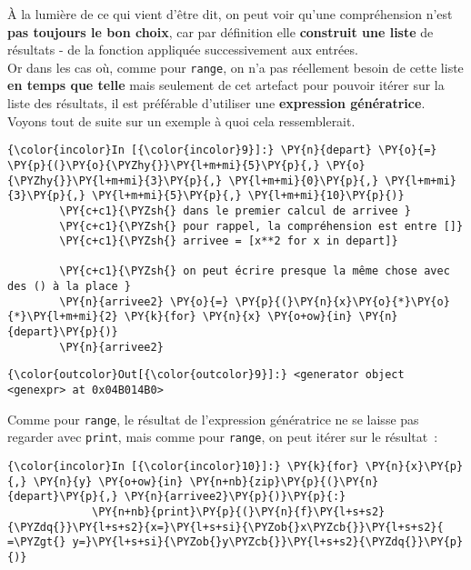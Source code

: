     À la lumière de ce qui vient d'être dit, on peut voir qu'une
compréhension n'est \textbf{pas toujours le bon choix}, car par
définition elle \textbf{construit une liste} de résultats - de la
fonction appliquée successivement aux entrées.\\

Or dans les cas où, comme pour \texttt{range}, on n'a pas réellement
besoin de cette liste \textbf{en temps que telle} mais seulement de cet
artefact pour pouvoir itérer sur la liste des résultats, il est
préférable d'utiliser une \textbf{expression génératrice}.\\

Voyons tout de suite sur un exemple à quoi cela ressemblerait.

    \begin{Verbatim}[commandchars=\\\{\}]
{\color{incolor}In [{\color{incolor}9}]:} \PY{n}{depart} \PY{o}{=} \PY{p}{(}\PY{o}{\PYZhy{}}\PY{l+m+mi}{5}\PY{p}{,} \PY{o}{\PYZhy{}}\PY{l+m+mi}{3}\PY{p}{,} \PY{l+m+mi}{0}\PY{p}{,} \PY{l+m+mi}{3}\PY{p}{,} \PY{l+m+mi}{5}\PY{p}{,} \PY{l+m+mi}{10}\PY{p}{)}
        \PY{c+c1}{\PYZsh{} dans le premier calcul de arrivee }
        \PY{c+c1}{\PYZsh{} pour rappel, la compréhension est entre []}
        \PY{c+c1}{\PYZsh{} arrivee = [x**2 for x in depart]}
        
        \PY{c+c1}{\PYZsh{} on peut écrire presque la même chose avec des () à la place }
        \PY{n}{arrivee2} \PY{o}{=} \PY{p}{(}\PY{n}{x}\PY{o}{*}\PY{o}{*}\PY{l+m+mi}{2} \PY{k}{for} \PY{n}{x} \PY{o+ow}{in} \PY{n}{depart}\PY{p}{)}
        \PY{n}{arrivee2}
\end{Verbatim}


\begin{Verbatim}[commandchars=\\\{\}]
{\color{outcolor}Out[{\color{outcolor}9}]:} <generator object <genexpr> at 0x04B014B0>
\end{Verbatim}
            
    Comme pour \texttt{range}, le résultat de l'expression génératrice ne se
laisse pas regarder avec \texttt{print}, mais comme pour \texttt{range},
on peut itérer sur le résultat~:

    \begin{Verbatim}[commandchars=\\\{\}]
{\color{incolor}In [{\color{incolor}10}]:} \PY{k}{for} \PY{n}{x}\PY{p}{,} \PY{n}{y} \PY{o+ow}{in} \PY{n+nb}{zip}\PY{p}{(}\PY{n}{depart}\PY{p}{,} \PY{n}{arrivee2}\PY{p}{)}\PY{p}{:}
             \PY{n+nb}{print}\PY{p}{(}\PY{n}{f}\PY{l+s+s2}{\PYZdq{}}\PY{l+s+s2}{x=}\PY{l+s+si}{\PYZob{}x\PYZcb{}}\PY{l+s+s2}{ =\PYZgt{} y=}\PY{l+s+si}{\PYZob{}y\PYZcb{}}\PY{l+s+s2}{\PYZdq{}}\PY{p}{)}
\end{Verbatim}


